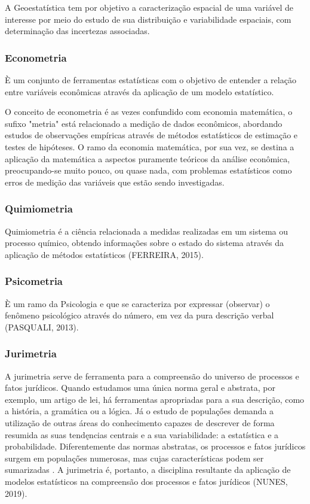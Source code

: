 A Geoestatística tem por objetivo a
caracterização espacial de uma variável de interesse por meio do
estudo de sua distribuição e variabilidade espaciais, com
determinação das incertezas associadas.\vskip0.3cm


\subsubsection{Econometria} 

È um conjunto de ferramentas estatísticas com o objetivo de entender a relação entre variáveis econômicas através da aplicação de um modelo estatístico.\vskip0.3cm

O conceito de econometria é as vezes confundido com economia matemática, o sufixo "metria"
está relacionado a medição de dados econômicos, abordando estudos de observações empíricas
através de métodos estatísticos de estimação e testes de hipóteses. O ramo da economia
matemática, por sua vez, se destina a aplicação da matemática a aspectos puramente teóricos
da análise econômica, preocupando-se muito pouco, ou quase nada, com problemas estatísticos
como erros de medição das variáveis que estão sendo investigadas.\vskip0.3cm


\subsubsection{Quimiometria} 

Quimiometria é a ciência relacionada a
medidas realizadas em um sistema ou processo químico, obtendo
informações sobre o estado do sistema através da aplicação de
métodos estatísticos (FERREIRA, 2015).\vskip0.3cm

\subsubsection{Psicometria} 

È um ramo da Psicologia e que se caracteriza por expressar (observar) o fenômeno psicológico através do número, em vez da pura descrição verbal (PASQUALI, 2013).  
\vskip0.3cm

\subsubsection{Jurimetria} 

A jurimetria serve de ferramenta para a compreensão do universo de processos e fatos jurídicos. Quando estudamos uma única norma geral e abstrata, por exemplo, um artigo de lei, há ferramentas apropriadas para a sua descrição, como a história, a gramática ou a lógica. Já o estudo de populaçőes demanda a utilização de outras áreas do conhecimento capazes de descrever de forma resumida as suas tendęncias centrais e a sua variabilidade: a estatística e a probabilidade. Diferentemente das normas abstratas, os processos e fatos jurídicos surgem em populaçőes numerosas, mas cujas características podem ser sumarizadas . A jurimetria é, portanto, a disciplina resultante da aplicação de modelos estatísticos na compreensão dos processos e fatos jurídicos (NUNES, 2019).\vskip0.3cm

